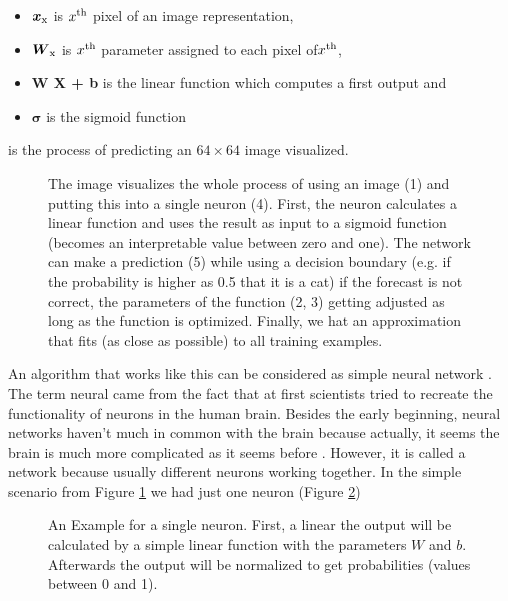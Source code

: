 \begin{itemize}
	\item \(\boldsymbol{x\textsubscript{x}} \) is \(x\textsuperscript{th}\) pixel of an image representation,
	\item \(\boldsymbol{W\textsubscript{x}}\) is \(x\textsuperscript{th}\) parameter assigned to each pixel of\(x\textsuperscript{th}\),
	\item \textbf{W X + b} is  the linear function which computes a first output and
	\item \(\boldsymbol{\sigma}\) is the sigmoid function
\end{itemize}

is the process of predicting an \(64\times64 \) image visualized.

\begin{figure}[htp]
	\caption{The image visualizes the whole process of using an image (1) and putting this into a single neuron (4). First, the neuron calculates a linear function and uses the result as input to a sigmoid function (becomes an interpretable value between zero and one). The network can make a prediction (5) while using a decision boundary (e.g. if the probability is higher as 0.5 that it is a cat) if the forecast is not correct, the parameters of the function (2, 3) getting adjusted as long as the function is optimized. Finally, we hat an approximation that fits (as close as possible) to all training examples.}
	\label{fig:08_process_of_pretictions_for_a_cat_image}
\end{figure}

An algorithm that works like this can be considered as simple neural network \cite{Britz2015}. The term neural came from the fact that at first scientists tried to recreate the functionality of neurons in the human brain. Besides the early beginning, neural networks haven't much in common with the brain because actually, it seems the brain is much more complicated as it seems before \cite{Kriesel2007NeuralNetworks}. However, it is called a network because usually different neurons working together. In the simple scenario from Figure \ref{fig:08_process_of_pretictions_for_a_cat_image} we had just one neuron (Figure \ref{fig:09_example_of_a_single_neuron})

\begin{figure}[htp]
	\centering
	\caption{An Example for a single neuron. First, a linear the output will be calculated by a simple linear function with the parameters \(W\) and \(b\). Afterwards the output will be normalized to get probabilities (values between 0 and 1).}
	\label{fig:09_example_of_a_single_neuron}
\end{figure}

